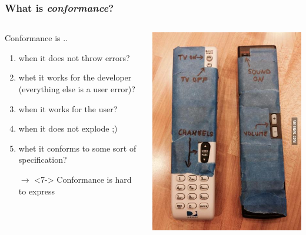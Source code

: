 \documentclass{beamer}
\begin{document}
\begin{frame}
\frametitle{What is \textit{conformance}?}
    \begin{columns}[c] %
    	\begin{block}{Conformance is ..}
        \begin{enumerate}[(1)]
          \item<2-> when it does not throw errors?
          \item<3-> whet it works for the developer (everything else is a user
          error)?
          \item<4-> when it works for the user?
          \item<5-> when it does not explode ;) 
          \item<6-> whet it conforms to some sort of specification?
          \item[$\xrightarrow{\ }$]<7-> Conformance is hard to express
        \end{enumerate}
        \end{block}
            \includegraphics[width=\textwidth]{../img/perfect_remote_control}
    \end{columns}
\end{frame}
\end{document}
